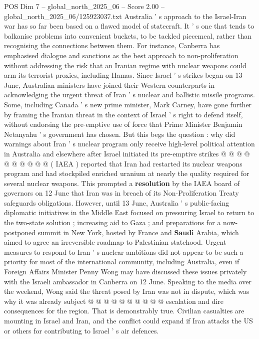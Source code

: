 \begin{textsample}{POS Dim 7 – global\_north\_2025\_06 – Score 2.00 – global\_north\_2025\_06/125923037.txt}  \label{ex:f7_pos_375}
Australia ' s approach to the Israel-Iran war has so far been based on a flawed model of statecraft.
It ' s one that tends to balkanise problems into convenient buckets, to be tackled piecemeal, rather than recognising the connections between them.
For instance, Canberra has emphasised dialogue and sanctions as the best approach to non-proliferation without addressing the risk that an Iranian regime with nuclear weapons could arm its terrorist proxies, including Hamas.
Since Israel ' s strikes began on 13 June, Australian ministers have joined their Western counterparts in acknowledging the urgent threat of Iran ' s nuclear and ballistic missile programs.
Some, including Canada ' s new prime minister, Mark Carney, have gone further by framing the Iranian threat in the context of Israel ' s right to defend itself, without endorsing the pre-emptive use of force that Prime Minister Benjamin Netanyahu ' s government has chosen.
But this begs the question : why did warnings about Iran ' s nuclear program only receive high-level political attention in Australia and elsewhere after Israel initiated its pre-emptive strikes @ @ @ @ @ @ @ @ @ @ ( IAEA ) reported that Iran had restarted its nuclear weapons program and had stockpiled enriched uranium at nearly the quality required for several nuclear weapons.
This prompted a \textbf{resolution} by the IAEA board of governors on 12 June that Iran was in breach of its Non-Proliferation Treaty safeguards obligations.
However, until 13 June, Australia ' s public-facing diplomatic initiatives in the Middle East focused on pressuring Israel to return to the two-state solution ; increasing aid to Gaza ; and preparations for a now-postponed summit in New York, hosted by France and \textbf{Saudi} Arabia, which aimed to agree an irreversible roadmap to Palestinian statehood.
Urgent measures to respond to Iran ' s nuclear ambitions did not appear to be such a priority for most of the international community, including Australia, even if Foreign Affairs Minister Penny Wong may have discussed these issues privately with the Israeli ambassador in Canberra on 12 June.
Speaking to the media over the weekend, Wong said the threat posed by Iran was not in dispute, which was why it was already subject @ @ @ @ @ @ @ @ @ @ escalation and dire consequences for the region.
That is demonstrably true.
Civilian casualties are mounting in Israel and Iran, and the conflict could expand if Iran attacks the US or others for contributing to Israel ' s air defences.

\end{textsample}
